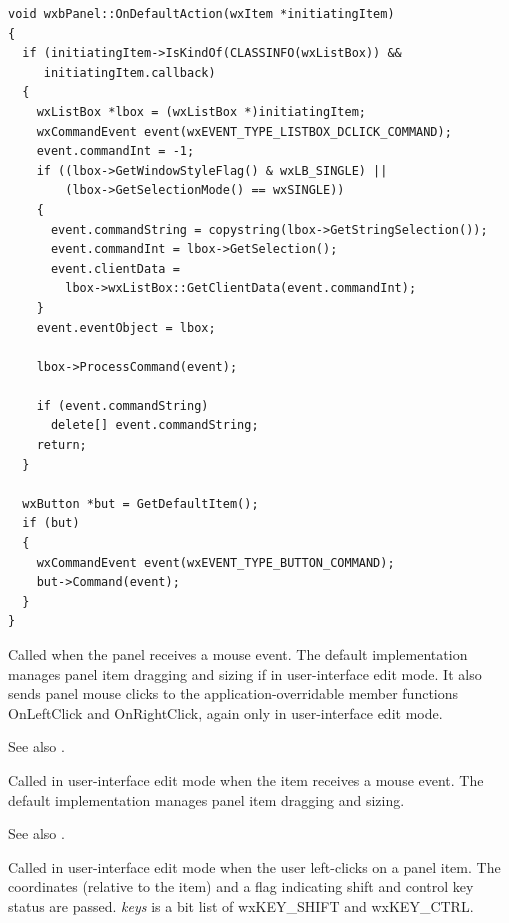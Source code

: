 {\small
\begin{verbatim}
void wxbPanel::OnDefaultAction(wxItem *initiatingItem)
{
  if (initiatingItem->IsKindOf(CLASSINFO(wxListBox)) &&
     initiatingItem.callback)
  {
    wxListBox *lbox = (wxListBox *)initiatingItem;
    wxCommandEvent event(wxEVENT_TYPE_LISTBOX_DCLICK_COMMAND);
    event.commandInt = -1;
    if ((lbox->GetWindowStyleFlag() & wxLB_SINGLE) ||
        (lbox->GetSelectionMode() == wxSINGLE))
    {
      event.commandString = copystring(lbox->GetStringSelection());
      event.commandInt = lbox->GetSelection();
      event.clientData =
        lbox->wxListBox::GetClientData(event.commandInt);
    }
    event.eventObject = lbox;

    lbox->ProcessCommand(event);

    if (event.commandString)
      delete[] event.commandString;
    return;
  }
  
  wxButton *but = GetDefaultItem();
  if (but)
  {
    wxCommandEvent event(wxEVENT_TYPE_BUTTON_COMMAND);
    but->Command(event);
  }
}
\end{verbatim}
}



Called  when the panel receives a mouse event.
The default implementation manages panel item dragging and sizing if in user-interface edit mode.
It also sends panel mouse clicks to the application-overridable member functions OnLeftClick
and OnRightClick, again only in user-interface edit mode.

See also .



Called in user-interface edit mode when the item receives a mouse event.
The default implementation manages panel item dragging and sizing.

See also .



Called in user-interface edit mode when the user left-clicks on a panel item.
The coordinates (relative to the item) and a flag indicating shift and control
key status are passed. {\it keys} is a bit list of wxKEY\_SHIFT and wxKEY\_CTRL.

